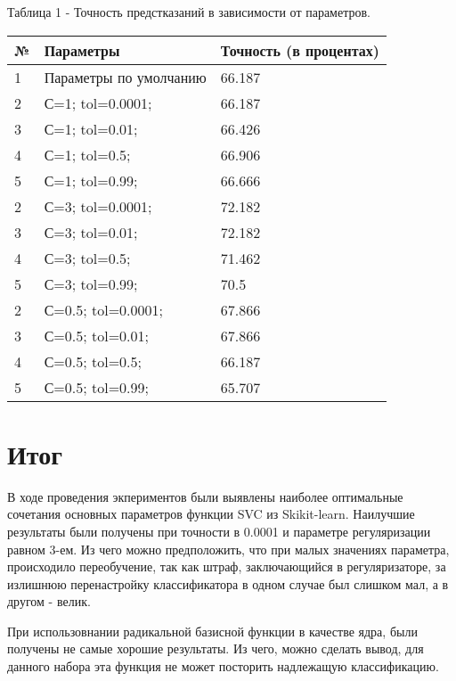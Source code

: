 \documentclass[a4paper,12pt]{article}
\begin{document}
	\vspace{0.5cm}
	Таблица 1 - Точность предстказаний в зависимости от параметров.
\begin{longtable}{|p{1cm}|p{9cm}|p{3cm}|}
\hline 
№ & Параметры & Точность (в процентах) \\ 
\hline 
1 & Параметры по умолчанию & 66.187 \\
\hline
2 & С=1; tol=0.0001; & 66.187 \\
\hline 
3 & С=1; tol=0.01; & 66.426 \\
\hline 
4 &  С=1; tol=0.5;  & 66.906 \\
\hline 
5 & С=1; tol=0.99;  & 66.666 \\
\hline
2 & С=3; tol=0.0001; & 72.182 \\
\hline 
3 & С=3; tol=0.01; & 72.182 \\
\hline 
4 &  С=3; tol=0.5;  & 71.462 \\
\hline 
5 & С=3; tol=0.99;  & 70.5 \\
\hline
2 & С=0.5; tol=0.0001; & 67.866 \\
\hline 
3 & С=0.5; tol=0.01; & 67.866 \\
\hline 
4 & С=0.5; tol=0.5;  & 66.187 \\
\hline 
5 & С=0.5; tol=0.99;  & 65.707 \\
\hline 
\end{longtable}


\newpage\section{Итог}
	В ходе проведения экпериментов были выявлены наиболее оптимальные сочетания основных параметров функции SVC из Skikit-learn.  Наилучшие результаты были получены при точности в 0.0001 и параметре регуляризации равном 3-ем. Из чего можно предположить, что при малых значениях параметра, происходило переобучение, так как штраф, заключающийся в регуляризаторе, за излишнюю перенастройку классификатора в одном случае был слишком мал, а в другом - велик.
	
	\vspace{0.5cm}
	При использовнании радикальной базисной функции в качестве ядра, были получены не самые хорошие результаты. Из чего, можно сделать вывод, для данного набора эта функция не может посторить надлежащую классификацию. 
	
	
\end{document}
